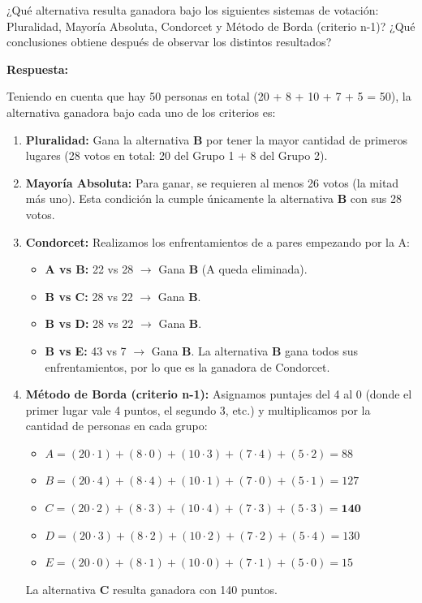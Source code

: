 \documentclass[
  letterpaper,
  DIV=11,
  numbers=noendperiod]{scrartcl}
\providecommand{\tightlist}{%
  \setlength{\itemsep}{0pt}\setlength{\parskip}{0pt}}
\begin{document}
¿Qué alternativa resulta ganadora bajo los siguientes sistemas de
votación: Pluralidad, Mayoría Absoluta, Condorcet y Método de Borda
(criterio n-1)? ¿Qué conclusiones obtiene después de observar los
distintos resultados?

\textbf{Respuesta:}

Teniendo en cuenta que hay 50 personas en total (20 + 8 + 10 + 7 + 5 =
50), la alternativa ganadora bajo cada uno de los criterios es:

\begin{enumerate}
\def\labelenumi{\arabic{enumi}.}
\item
  \textbf{Pluralidad:} Gana la alternativa \textbf{B} por tener la mayor
  cantidad de primeros lugares (28 votos en total: 20 del Grupo 1 + 8
  del Grupo 2).
\item
  \textbf{Mayoría Absoluta:} Para ganar, se requieren al menos 26 votos
  (la mitad más uno). Esta condición la cumple únicamente la alternativa
  \textbf{B} con sus 28 votos.
\item
  \textbf{Condorcet:} Realizamos los enfrentamientos de a pares
  empezando por la A:

  \begin{itemize}
  \tightlist
  \item
    \textbf{A vs B:} 22 vs 28 \(\rightarrow\) Gana \textbf{B} (A queda
    eliminada).
  \item
    \textbf{B vs C:} 28 vs 22 \(\rightarrow\) Gana \textbf{B}.
  \item
    \textbf{B vs D:} 28 vs 22 \(\rightarrow\) Gana \textbf{B}.
  \item
    \textbf{B vs E:} 43 vs 7 \(\rightarrow\) Gana \textbf{B}. La
    alternativa \textbf{B} gana todos sus enfrentamientos, por lo que es
    la ganadora de Condorcet.
  \end{itemize}
\item
  \textbf{Método de Borda (criterio n-1):} Asignamos puntajes del 4 al 0
  (donde el primer lugar vale 4 puntos, el segundo 3, etc.) y
  multiplicamos por la cantidad de personas en cada grupo:

  \begin{itemize}
  \tightlist
  \item
    \(A = (20 \cdot 1) + (8 \cdot 0) + (10 \cdot 3) + (7 \cdot 4) + (5 \cdot 2) = 88\)
  \item
    \(B = (20 \cdot 4) + (8 \cdot 4) + (10 \cdot 1) + (7 \cdot 0) + (5 \cdot 1) = 127\)
  \item
    \(C = (20 \cdot 2) + (8 \cdot 3) + (10 \cdot 4) + (7 \cdot 3) + (5 \cdot 3) = \textbf{140}\)
  \item
    \(D = (20 \cdot 3) + (8 \cdot 2) + (10 \cdot 2) + (7 \cdot 2) + (5 \cdot 4) = 130\)
  \item
    \(E = (20 \cdot 0) + (8 \cdot 1) + (10 \cdot 0) + (7 \cdot 1) + (5 \cdot 0) = 15\)
  \end{itemize}

  La alternativa \textbf{C} resulta ganadora con 140 puntos.
\end{enumerate}
\end{document}
